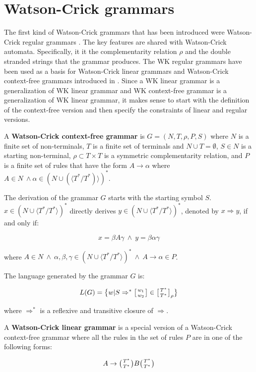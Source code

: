 \section{Watson-Crick grammars}
The first kind of Watson-Crick grammars that has been introduced were Watson-Crick regular grammars \cite{REG_GRAMMAR}. The key features are shared with Watson-Crick automata. Specifically, it it the complementarity relation $\rho$ and the double stranded strings that the grammar produces.
The WK regular grammars have been used as a basis for Watson-Crick linear grammars and Watson-Crick context-free grammars introduced in \cite{WK_GRAMMARS_1}. Since a WK linear grammar is a generalization of WK linear grammar and WK context-free grammar is a generalization of WK linear grammar, it makes sense to start with the definition of the context-free version and then specify the constraints of linear and regular versions.

A \textbf{Watson-Crick context-free grammar} is $G = (N, T, \rho, P, S)$ where $N$ is a finite set of non-terminals, $T$ is a finite set of terminals and $N \cup T = \emptyset$, $S \in N$ is a starting non-terminal, $\rho \subset T \times T$ is a symmetric complementarity relation, and $P$ is a finite set of rules that have the form $A \rightarrow \alpha$ where $A \in N \: \wedge \alpha \in (N \cup (\langle T^*/T^*)\rangle)^*$.

The derivation of the grammar $G$ starts with the starting symbol $S$. $x \in (N \cup \langle T^*/T^* \rangle)^*$ directly derives $y \in (N \cup \langle T^*/T^* \rangle)^*$, denoted by $x \Rightarrow y$, if and only if:

$$x = \beta A \gamma \: \wedge \: y = \beta \alpha \gamma$$

where $A \in N \: \wedge \: \alpha, \beta, \gamma \in (N \cup \langle T^*/T^* \rangle)^* \: \wedge \: A \rightarrow \alpha \in P$.

The language generated by the grammar $G$ is:

$$L(G) = \big\{ w| S \Rightarrow^* \wkdomain{w_1}{w_2} \in \wkdomain{T^*}{T^*}_{\rho} \big\}$$

where $\Rightarrow^*$ is a reflexive and transitive closure of $\Rightarrow$.

A \textbf{Watson-Crick linear grammar} is a special version of a Watson-Crick context-free grammar where all the rules in the set of rules $P$ are in one of the following forms:

$$A \rightarrow \wkpair{T^*}{T^*} B \wkpair{T^*}{T^*}$$

